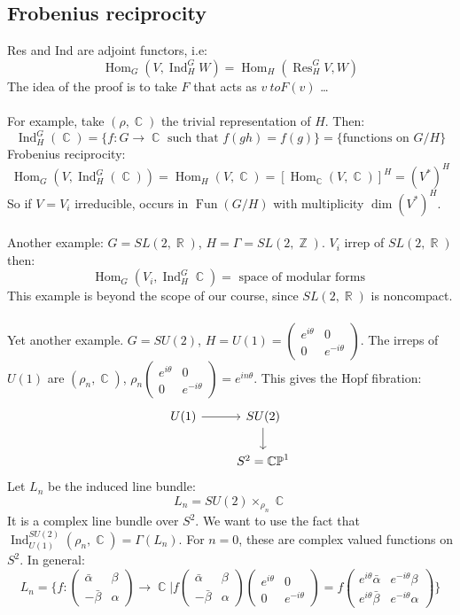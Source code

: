 \documentclass[12 pt]{article}
\DeclareMathOperator {\R} {\mathbb{R}}
\DeclareMathOperator {\C} {\mathbb{C}}
\DeclareMathOperator {\Z} {\mathbb{Z}}
\DeclareMathOperator {\Res} {Res}
\DeclareMathOperator {\Hom} {Hom}
\DeclareMathOperator {\Ind} {Ind}
\DeclareMathOperator {\Fun} {Fun}
\theoremstyle{plain}
\theoremstyle{definition}
\theoremstyle{remark}
\begin{document}
\subsection*{Frobenius reciprocity}
Res and Ind are adjoint functors, i.e:
\[     \Hom_G(V, \Ind_H^G W) = \Hom_H(\Res_H^G V, W)        \]
The idea of the proof is to take $F$ that acts as $v\ to F(v)$ \dots
\\
\\
For example, take $(\rho, \C)$ the trivial representation of $H$. Then:
\[       \Ind^G_H (\C) = \{ f: G \to \C \text{ such that } f(gh) = f(g)  \}  = \{ \text{functions on } G/H\}  \]
Frobenius reciprocity:
\[    \Hom_G (V,  \Ind^G_H (\C)) = \Hom_H (V,\C) = [\Hom_{\C}(V, \C)]^{H} = (V^*)^H     \]
So if $V = V_i$ irreducible, occurs in $\Fun(G/H)$ with multiplicity $\dim(V^*)^H$.
\\
\\
Another example: $G = SL(2,\R)$, $H = \Gamma = SL(2, \Z)$. $V_i$ irrep of $SL(2,\R)$ then:
\[    \Hom_G(V_i, \Ind_H^G \C) = \text{ space of modular forms }       \]
This example is beyond the scope of our course, since $SL(2, \R)$ is noncompact.
\\
\\
Yet another example. $G = SU(2)$, $H = U(1) = \left( \begin{array} {cc} e^{i\theta} & 0 \\ 0 & e^{-i\theta} \end{array} \right)$. The irreps of $U(1)$ are $(\rho_n, \C)$, $\rho_n \left( \begin{array} {cc} e^{i\theta} & 0 \\ 0 & e^{-i\theta} \end{array} \right) = e^{in\theta}$. This gives the Hopf fibration:
\[
\begin{tikzcd}
U(1) \arrow{r} & SU(2) \arrow{d} \\
 & S^2= \mathbb{CP}^1
\end{tikzcd}
\]
Let $L_n$ be the induced line bundle:
\[      L_n = SU(2) \times_{\rho_n} \C    \]
It is a complex line bundle over $S^2$. We want to use the fact that $\Ind_{U(1)}^{SU(2)} (\rho_n, \C) = \Gamma(L_n)$. For $n=0$, these are complex valued functions on $S^2$. In general:
\[      L_n = \{  f : \left( \begin{array} {cc} \bar\alpha & \beta \\ -\bar \beta & \alpha \end{array} \right)\to \C | f\left( \begin{array} {cc} \bar\alpha & \beta \\ -\bar \beta & \alpha \end{array} \right)\left( \begin{array} {cc} e^{i\theta} & 0 \\ 0 & e^{-i\theta} \end{array} \right) = f \left( \begin{array} {cc} e^{i\theta} \bar\alpha & e^{-i\theta} \beta \\ e^{i\theta}\bar \beta & e^{-i\theta}\alpha \end{array} \right) \}       \]
\end{document}
